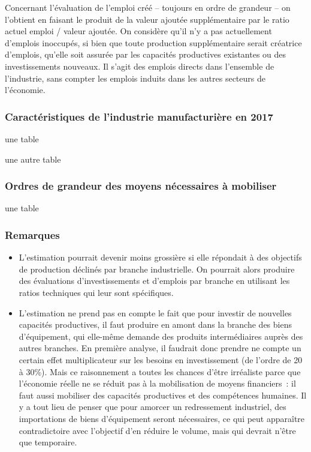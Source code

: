 \documentclass[a4paper]{article}
\begin{document}
Concernant l’évaluation de l’emploi créé – toujours en ordre de grandeur – on l’obtient en faisant le produit de la valeur ajoutée supplémentaire par le ratio actuel emploi / valeur ajoutée. On considère qu’il n’y a pas actuellement d’emplois inoccupés, si bien que toute production supplémentaire serait créatrice d’emplois, qu’elle soit assurée par les capacités productives existantes ou des investissements nouveaux. Il s’agit des emplois directs dans l’ensemble de l’industrie, sans compter les emplois induits dans les autres secteurs de l’économie.


\subsubsection{Caractéristiques de l’industrie manufacturière en 2017}
une table

une autre table

\subsubsection{Ordres de grandeur des moyens nécessaires à mobiliser}
une table

\subsubsection{Remarques}
\begin{itemize}
\item L’estimation pourrait devenir moins grossière si elle répondait à des objectifs de production déclinés par branche industrielle. On pourrait alors produire des évaluations d’investissements et d’emplois par branche en utilisant les ratios techniques qui leur sont spécifiques.

\item L’estimation ne prend pas en compte le fait que pour investir de nouvelles capacités productives, il faut produire en amont dans la branche des biens d’équipement, qui elle-même demande des produits intermédiaires auprès des autres branches. En première analyse, il faudrait donc prendre ne compte un certain effet multiplicateur sur les besoins en investissement (de l’ordre de 20 à 30\%). Mais ce raisonnement a toutes les chances d’être irréaliste parce que l’économie réelle ne se réduit pas à la mobilisation de moyens financiers~: il faut aussi mobiliser des capacités productives et des compétences humaines. Il y a tout lieu de penser que pour amorcer un redressement industriel, des importations de biens d’équipement seront nécessaires, ce qui peut apparaître contradictoire avec l’objectif d’en réduire le volume, mais qui devrait n’être que temporaire.
\end{itemize}
\end{document}

